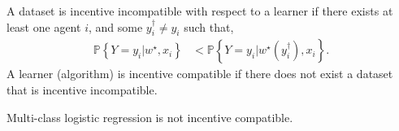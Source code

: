 \documentclass{article}
\begin{document}
\begin{df} \label{df:ic} 
A dataset is incentive incompatible with respect to a learner if there exists at least one agent $i $, and some $y^{\dagger}_{i} \neq  y_{i}$ such that,
\begin{align*}
\mathbb{P}\left\{Y = y_{i} | w^\star , x_{i}\right\} &< \mathbb{P}\left\{Y = y_{i} | w^\star \left(y^{\dagger}_{i}\right), x_{i}\right\}.
\end{align*}
A learner (algorithm) is incentive compatible if there does not exist a dataset that is incentive incompatible.
\newline \newline\end{df}
\begin{prop} \label{prop:logit} 
Multi-class logistic regression is not incentive compatible.
\end{prop}
\end{document}
